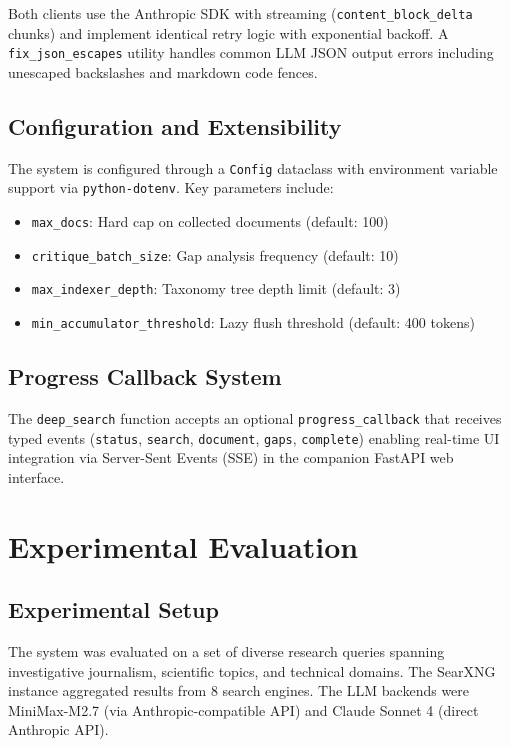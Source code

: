 \documentclass[conference]{IEEEtran}
\begin{document}
Both clients use the Anthropic SDK with streaming (\texttt{content\_block\_delta} chunks) and implement identical retry logic with exponential backoff. A \texttt{fix\_json\_escapes} utility handles common LLM JSON output errors including unescaped backslashes and markdown code fences.

\subsection{Configuration and Extensibility}

The system is configured through a \texttt{Config} dataclass with environment variable support via \texttt{python-dotenv}. Key parameters include:

\begin{itemize}
    \item \texttt{max\_docs}: Hard cap on collected documents (default: 100)
    \item \texttt{critique\_batch\_size}: Gap analysis frequency (default: 10)
    \item \texttt{max\_indexer\_depth}: Taxonomy tree depth limit (default: 3)
    \item \texttt{min\_accumulator\_threshold}: Lazy flush threshold (default: 400 tokens)
\end{itemize}

\subsection{Progress Callback System}

The \texttt{deep\_search} function accepts an optional \texttt{progress\_callback} that receives typed events (\texttt{status}, \texttt{search}, \texttt{document}, \texttt{gaps}, \texttt{complete}) enabling real-time UI integration via Server-Sent Events (SSE) in the companion FastAPI web interface.

\section{Experimental Evaluation}

\subsection{Experimental Setup}

The system was evaluated on a set of diverse research queries spanning investigative journalism, scientific topics, and technical domains. The SearXNG instance aggregated results from 8 search engines. The LLM backends were MiniMax-M2.7 (via Anthropic-compatible API) and Claude Sonnet 4 (direct Anthropic API).
\end{document}
